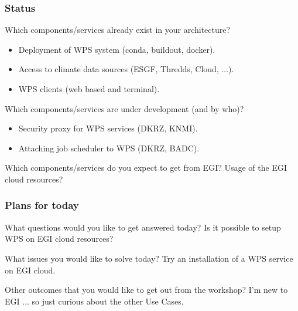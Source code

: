 \documentclass{beamer}
\begin{document}
   \begin{frame}[shrink]
    \frametitle{Status}
    \begin{block}{Which components/services already exist in your architecture?}
      \begin{itemize}
         \item Deployment of WPS system (conda, buildout, docker). 
         \item Access to climate data sources (ESGF, Thredds, Cloud, ...).
         \item WPS clients (web based and terminal).
      \end{itemize}
    \end{block}
    \begin{block}{Which components/services are under development (and by who)?}
      \begin{itemize}
        \item Security proxy for WPS services (DKRZ, KNMI).
        \item Attaching job scheduler to WPS (DKRZ, BADC). 
       \end{itemize}
    \end{block}
    \begin{block}{Which components/services do you expect to get from EGI?}
      Usage of the EGI cloud resources?
    \end{block} 
  \end{frame}


   \begin{frame}[shrink]
    \frametitle{Plans for today}
    \begin{block}{What questions would you like to get answered today?}
      Is it possible to setup WPS on EGI cloud resources?
    \end{block}
    \begin{block}{What issues you would like to solve today?}
      Try an installation of a WPS service on EGI cloud.
    \end{block}
    \begin{block}{Other outcomes that you would like to get out from the workshop?}
      I'm new to EGI ... so just curious about the other Use Cases.
    \end{block}
  \end{frame}


  \appendix
\end{document}
